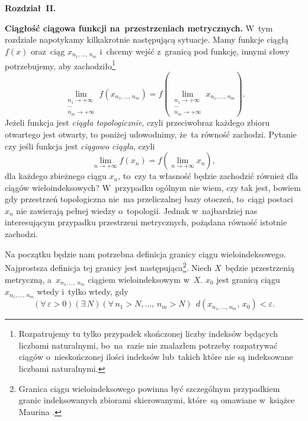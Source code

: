\documentclass[a4paper,11pt]{article}
\begin{document}
\noindent
\textbf{Rozdział~II.}

\vspace{\spaceFour}


\start \textbf{Ciągłość ciągowa funkcji na~przestrzeniach metrycznych.}
W~tym rozdziale napotykamy kilkakrotnie następującą sytuacje. Mamy
funkcje ciągłą $f( x )$ oraz~ciąg $x_{ n_{ 1 }, \ldots, \, n_{ m } }$
i~chcemy wejść z~granicą pod funkcję, innymi słowy potrzebujemy, aby
zachodziło\footnote{Rozpatrujemy tu tylko przypadek skończonej liczby
  indeksów będących liczbami naturalnymi, bo~na~razie nie znalazłem
  potrzeby rozpatrywać ciągów o~nieskończonej ilości indeksów
  lub~takich które nie są indeksowane liczbami naturalnymi.}
\begin{equation}
  \label{eq:RS-Vol-I-s01-08}
  \lim\limits_{ \substack{ n_{ 1 } \to +\infty \\ \cdots \\  n_{ m } \to +\infty } }
  f( x_{ n_{ 1 }, \ldots, \, n_{ m } } )
  =
  f( \lim_{ \substack{ n_{ 1 } \to +\infty \\ \cdots \\ n_{ m } \to +\infty } }
  x_{ n_{ 1 }, \ldots, \, n_{ m } } ).
\end{equation}
Jeżeli funkcja jest \textit{ciągła topologicznie}, czyli przeciwobraz
każdego zbioru otwartego jest otwarty, to poniżej udowodnimy, że~ta
równość zachodzi. Pytanie czy jeśli funkcja jest \textit{ciągowo
  ciągła}, czyli
\begin{equation}
  \label{eq:RS-Vol-I-s01-09}
  \lim\limits_{ n \to +\infty } f( x_{ n } )
  = f( \lim\limits_{ n \to +\infty } x_{ n } ),
\end{equation}
dla każdego zbieżnego ciągu $x_{ n }$, to~czy ta własność będzie
zachodzić również dla ciągów wieloindeksowych? W~przypadku ogólnym nie
wiem, czy tak jest, bowiem gdy przestrzeń topologiczna nie~ma
przeliczalnej bazy otoczeń, to~ciągi postaci $x_{ n }$ nie zawierają
pełnej wiedzy o~topologii. Jednak w~najbardziej nas interesującym
przypadku przestrzeni metrycznych, pożądana równość istotnie zachodzi.

Na początku będzie nam potrzebna definicja granicy ciągu
wieloindeksowego. Najprostsza definicja tej granicy jest
następująca\footnote{Granica ciągu wieloindeksowego powinna być
  szczególnym przypadkiem granic indeksowanych zbiorami skierowanymi,
  które~są omawiane w~książce Maurina \cite{MaurinAnalizaVolI1974}.}. Niech
$X$~będzie przestrzenią metryczną, a~$x_{ n_{ 1 }, \ldots, \, n_{ m } }$
ciągiem wieloindeksowym w~$X$. $x_{ 0 }$ jest granicą ciągu
$x_{ n_{ 1 }, \ldots, \, n_{ m } }$ wtedy i~tylko wtedy, gdy
\begin{equation}
  \label{eq:RS-Vol-I-s01-10}
  ( \forall \, \varepsilon > 0) ( \exists \, N )
  ( \forall \, n_{ 1 } > N, \ldots, \, n_{ m } > N ) \;\,
  d( x_{ n_{ 1 }, \ldots, \, n_{ m } }, \, x_{ 0 } ) < \varepsilon.
\end{equation}
\end{document}
